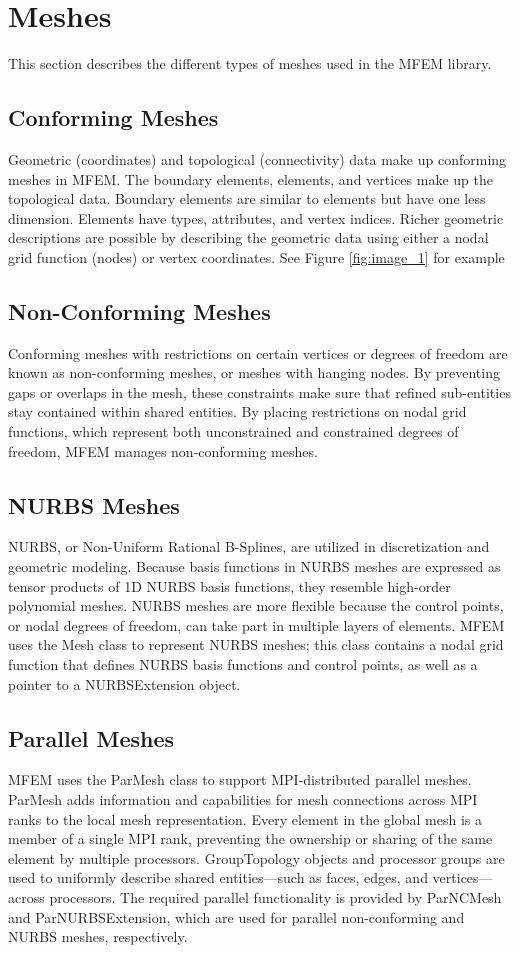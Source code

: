 \documentclass{article}
\begin{document}
\section{Meshes}
This section describes the different types of meshes used in the MFEM library.
\subsection{Conforming Meshes}
Geometric (coordinates) and topological (connectivity) data make up conforming meshes in MFEM. The boundary elements, elements, and vertices make up the topological data. Boundary elements are similar to elements but have one less dimension. Elements have types, attributes, and vertex indices. Richer geometric descriptions are possible by describing the geometric data using either a nodal grid function (nodes) or vertex coordinates. See Figure \ref{fig:image_1} for example
\subsection{Non-Conforming Meshes}
Conforming meshes with restrictions on certain vertices or degrees of freedom are known as non-conforming meshes, or meshes with hanging nodes. By preventing gaps or overlaps in the mesh, these constraints make sure that refined sub-entities stay contained within shared entities. By placing restrictions on nodal grid functions, which represent both unconstrained and constrained degrees of freedom, MFEM manages non-conforming meshes.

\subsection{NURBS Meshes}
NURBS, or Non-Uniform Rational B-Splines, are utilized in discretization and geometric modeling. Because basis functions in NURBS meshes are expressed as tensor products of 1D NURBS basis functions, they resemble high-order polynomial meshes. NURBS meshes are more flexible because the control points, or nodal degrees of freedom, can take part in multiple layers of elements. MFEM uses the Mesh class to represent NURBS meshes; this class contains a nodal grid function that defines NURBS basis functions and control points, as well as a pointer to a NURBSExtension object.
\subsection{Parallel Meshes}
MFEM uses the ParMesh class to support MPI-distributed parallel meshes. ParMesh adds information and capabilities for mesh connections across MPI ranks to the local mesh representation. Every element in the global mesh is a member of a single MPI rank, preventing the ownership or sharing of the same element by multiple processors. GroupTopology objects and processor groups are used to uniformly describe shared entities—such as faces, edges, and vertices—across processors. The required parallel functionality is provided by ParNCMesh and ParNURBSExtension, which are used for parallel non-conforming and NURBS meshes, respectively.
\end{document}
